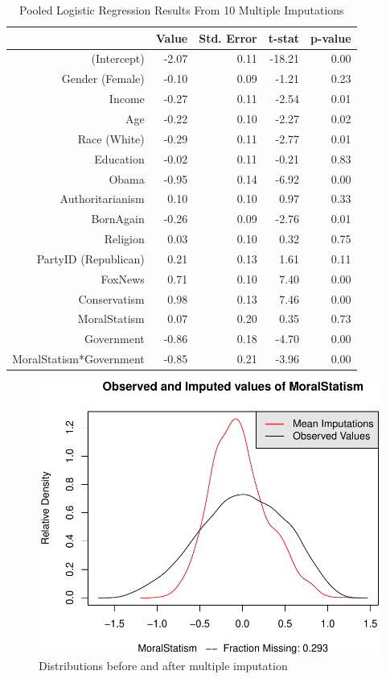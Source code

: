 \documentclass[12pt,]{article}
\begin{document}
\begin{table}[ht]
\centering
\begin{tabular}{rrrrr}
  \hline
 & Value & Std. Error & t-stat & p-value \\ 
  \hline
(Intercept) & -2.07 & 0.11 & -18.21 & 0.00 \\ 
  Gender (Female) & -0.10 & 0.09 & -1.21 & 0.23 \\ 
  Income & -0.27 & 0.11 & -2.54 & 0.01 \\ 
  Age & -0.22 & 0.10 & -2.27 & 0.02 \\ 
  Race (White) & -0.29 & 0.11 & -2.77 & 0.01 \\ 
  Education & -0.02 & 0.11 & -0.21 & 0.83 \\ 
  Obama & -0.95 & 0.14 & -6.92 & 0.00 \\ 
  Authoritarianism & 0.10 & 0.10 & 0.97 & 0.33 \\ 
  BornAgain & -0.26 & 0.09 & -2.76 & 0.01 \\ 
  Religion & 0.03 & 0.10 & 0.32 & 0.75 \\ 
  PartyID (Republican) & 0.21 & 0.13 & 1.61 & 0.11 \\ 
  FoxNews & 0.71 & 0.10 & 7.40 & 0.00 \\ 
  Conservatism & 0.98 & 0.13 & 7.46 & 0.00 \\ 
  MoralStatism & 0.07 & 0.20 & 0.35 & 0.73 \\ 
  Government & -0.86 & 0.18 & -4.70 & 0.00 \\ 
  MoralStatism*Government & -0.85 & 0.21 & -3.96 & 0.00 \\ 
   \hline
\end{tabular}
\caption{Pooled Logistic Regression Results From 10 Multiple Imputations} 
\end{table}


\clearpage

\begin{figure}[htbp]
\centering
\includegraphics{figures/missing2-1.pdf}
\caption{Distributions before and after multiple imputation}
\end{figure}
\end{document}
